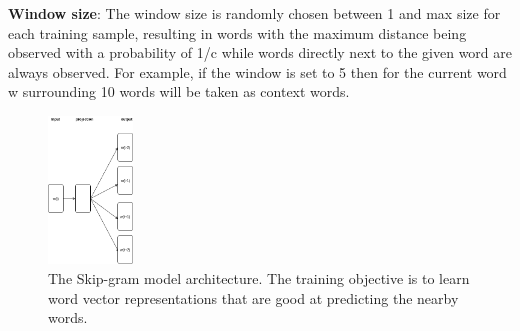 \textbf{Window size}: The window size is randomly chosen between 1 and max size for each training sample, resulting in words with the maximum distance being observed with a probability of 1/c while words directly next to the given word are always observed. For example, if the window is set to 5 then for the current word w surrounding 10 words will be taken as context words.
	


\begin{figure}[t!]
	
	\includegraphics[width=0.20\textwidth]{skipgram}
	\caption{The Skip-gram model architecture. The training objective is to learn word vector representations that are good at predicting the nearby words.}
	\label{fig:clf}
\end{figure}

